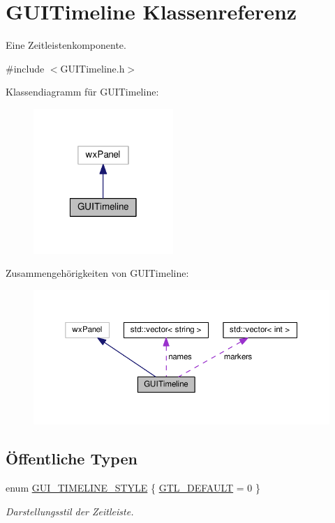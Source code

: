 \hypertarget{classGUITimeline}{\section{G\-U\-I\-Timeline Klassenreferenz}
\label{classGUITimeline}
}


Eine Zeitleistenkomponente.  




{\ttfamily \#include $<$G\-U\-I\-Timeline.\-h$>$}



Klassendiagramm für G\-U\-I\-Timeline\-:
\nopagebreak
\begin{figure}[H]
\begin{center}
\leavevmode
\includegraphics[width=150pt]{classGUITimeline__inherit__graph}
\end{center}
\end{figure}


Zusammengehörigkeiten von G\-U\-I\-Timeline\-:
\nopagebreak
\begin{figure}[H]
\begin{center}
\leavevmode
\includegraphics[width=350pt]{classGUITimeline__coll__graph}
\end{center}
\end{figure}
\subsection*{Öffentliche Typen}
\begin{DoxyCompactItemize}
\item 
enum \hyperlink{classGUITimeline_a56f1cf170a8c077a0b94d19a0eba8c94}{G\-U\-I\-\_\-\-T\-I\-M\-E\-L\-I\-N\-E\-\_\-\-S\-T\-Y\-L\-E} \{ \hyperlink{classGUITimeline_a56f1cf170a8c077a0b94d19a0eba8c94a9c676c8ba0c3c3312938d34a8e855bb1}{G\-T\-L\-\_\-\-D\-E\-F\-A\-U\-L\-T} = 0
 \}
\begin{DoxyCompactList}\small\item\em Darstellungsstil der Zeitleiste. \end{DoxyCompactList}\end{DoxyCompactItemize}
